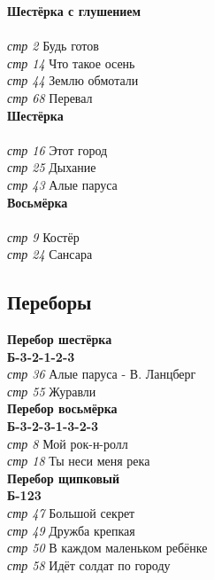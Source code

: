 \documentclass[fleqn,a5paper,12pt,twoside]{guitartabs}
\newcommand{\musVspace}{\vspace{2mm}}
\begin{document}
\textbf{Шестёрка с глушением}\musVspace\\
\musVspace\\
\textit{стр 2} Будь готов\\
\textit{стр 14} Что такое осень\\
\textit{стр 44} Землю обмотали\\
\textit{стр 68} Перевал\\

\textbf{Шестёрка}\musVspace\\
\scalebox{2}{$\mathsf{\downarrow\_\downarrow\hspace{1.5mm}\uparrow\_\uparrow\hspace{1.5mm}\downarrow\hspace{1.5mm}\uparrow}$}\musVspace\\
\textit{стр 16} Этот город \\
\textit{стр 25} Дыхание\\
\textit{стр 43} Алые паруса\\

\textbf{Восьмёрка}\musVspace\\
\scalebox{2}{$\mathsf{\downarrow\_\_\_\downarrow\_\_\_\uparrow\_\uparrow\_\downarrow\downarrow\downarrow\uparrow}$}\musVspace\\
\textit{стр 9} Костёр\\
\textit{стр 24} Сансара
\newpage
{}%
\subsection*{Переборы}
\textbf{Перебор шестёрка}\musVspace\\
\textbf{Б-3-2-1-2-3}\musVspace\\
\textit{стр 36} Алые паруса - В. Ланцберг\\
\textit{стр 55} Журавли\\

\textbf{Перебор восьмёрка}\musVspace\\
\textbf{Б-3-2-3-1-3-2-3}\musVspace\\
\textit{стр 8} Мой рок-н-ролл\\
\textit{стр 18} Ты неси меня река\\

\textbf{Перебор щипковый}\musVspace\\
\textbf{Б-123}\musVspace\\
\textit{стр 47} Большой секрет\\
\textit{стр 49} Дружба крепкая\\
\textit{стр 50} В каждом маленьком ребёнке\\
\textit{стр 58} Идёт солдат по городу\\
\end{document}
